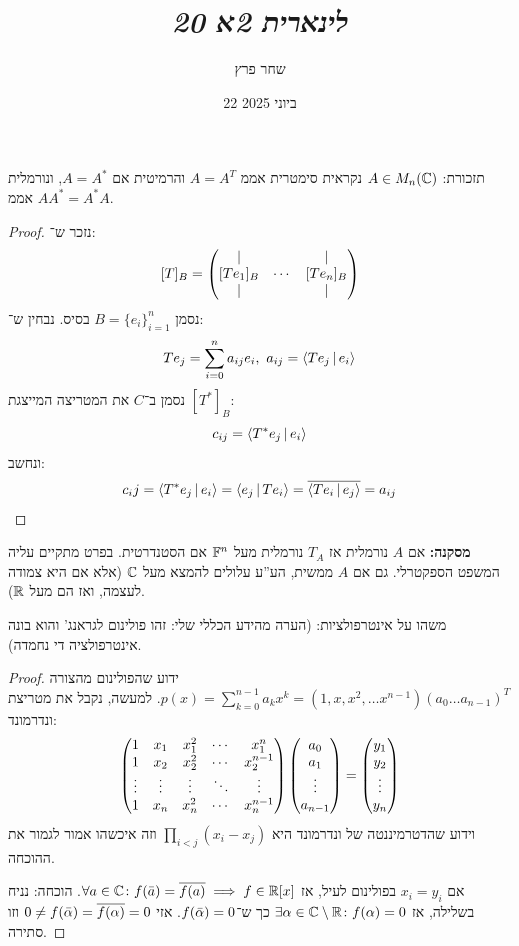 \documentclass[]{../../../../tex/classes/styledArticle}
\author{שחר פרץ}
\title{\textit{לינארית 2א 20}}
\date{22 ביוני 2025}
\begin{document}
	\maketitle
	תזכורת: $A \in M_n(\mathbb{C})$ נקראית סימטרית אממ $A = A^T$ והרמיטית אם $A = A^*$, ונורמלית אממ $AA^* = A^*A$. 
	
	\begin{proof}
		נזכר ש־: 
		\[ [T]_B = \begin{pmatrix} \vert &  & \vert \\ [Te_1]_B & \cdots & [Te_n]_B \\ \vert &  & \vert \end{pmatrix} \]
		נסמן $B = \{e_i\}_{i = 1}^{n}$ בסיס. נבחין ש־: 
		\[ Te_j = \sumni a_{ij}e_i, \ a_{ij} = \mut{Te_j}{e_i} \]
		נסמן ב־$C$ את המטריצה המייצגת $[T^*]_B$: 
		\[ c_{ij} = \left \langle T^*e_j \,\middle|\, e_i \right \rangle \]
		ונחשב: 
		\[ c_ij = \left \langle T^*e_j \,\middle|\, e_i \right \rangle = \left \langle e_j \,\middle|\, Te_i \right \rangle = \overline{\left \langle Te_i \,\middle|\, e_j \right \rangle} = a_{ij} \]
		
	\end{proof}
	
	\textbf{מסקנה: }אם $A$ נורמלית אז $T_A$ נורמלית מעל $\mathbb{F}^n$ אם הסטנדרטית. בפרט מתקיים עליה המשפט הספקטרלי. גם אם $A$ ממשית, הע''ע עלולים להמצא מעל $\mathbb{C}$ (אלא אם היא צמודה לעצמה, ואז הם מעל $\mathbb{R}$). 
	
	משהו על אינטרפולציות: 
	(הערה מהידע הכללי שלי: זהו פולינום לגראנג' והוא בונה אינטרפולציה די נחמדה). \begin{proof}
		ידוע שהפולינום מהצורה $p(x)  = \sum_{k = 0}^{n - 1} a_k x^k  = (1, x, x^2, \dots x^{n - 1}) (a_0 \dots a_{n - 1})^T$. למעשה, נקבל את מטריצת ונדרמונד: 
		\[ \begin{pmatrix} 1 & x_1 & x_1^2 & \cdots & x_1^n \\ 1 & x_2 & x_2^2 & \cdots & x_2^{n - 1} \\ \vdots & \vdots & \vdots & \ddots & \vdots \\ 1 & x_n & x_n^2 & \cdots & x_n^{n - 1} \end{pmatrix}\begin{pmatrix} a_0 \\ a_1 \\ \vdots \\ a_{n - 1} \end{pmatrix} = \begin{pmatrix} y_1 \\ y_2 \\ \vdots \\ y_n \end{pmatrix} \]
		וידוע שהדטרמיננטה של ונדרמונד היא $\prod_{i < j} (x_i - x_j)$ וזה איכשהו אמור לגמור את ההוכחה. 
		
		אם $x_i = y_i$ בפולינום לעיל, אז $\forall a \in \mathbb{C} \colon f(\bar a) = \overline{f(a)} \implies f \in \mathbb{R}[x]$. הוכחה: נניח בשלילה, אז $\exists \alpha \in \mathbb{C}\setminus \mathbb{R} \colon f(\alpha) = 0$ כך ש־$f(\bar {\alpha}) = 0$. אזי $0 \neq f(\bar {\alpha}) = \overline{f(\alpha)}  = 0$ וזו סתירה. 
	\end{proof}
	
\end{document}
